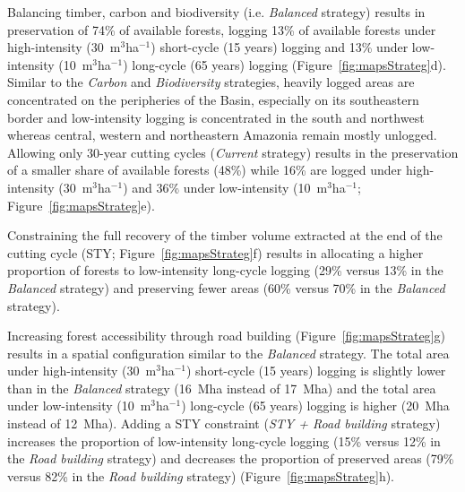 \documentclass{article}
\begin{document}
Balancing timber, carbon and biodiversity (i.e. \textit{Balanced} strategy) results in preservation of 74\% of available forests, logging 13\% of available forests under high-intensity (30~m$^3$ha$^{-1}$) short-cycle (15 years) logging and 13\% under low-intensity (10~m$^3$ha$^{-1}$) long-cycle (65 years) logging (Figure~\ref{fig:mapsStrateg}d). Similar to the \textit{Carbon} and \textit{Biodiversity} strategies, heavily logged areas are concentrated on the peripheries of the Basin, especially on its southeastern border and  low-intensity logging is concentrated in the south and northwest whereas central, western and northeastern Amazonia remain mostly unlogged. Allowing only 30-year cutting cycles (\textit{Current} strategy) results in the preservation of a smaller share of available forests (48\%) while 16\% are logged under high-intensity (30~m$^3$ha$^{-1}$) and 36\% under low-intensity (10~m$^3$ha$^{-1}$;  Figure~\ref{fig:mapsStrateg}e). 

Constraining the full recovery of the timber volume extracted at the end of the cutting cycle (STY; Figure~\ref{fig:mapsStrateg}f) results in allocating a higher proportion of forests to low-intensity long-cycle logging (29\% versus 13\% in the \textit{Balanced} strategy) and preserving fewer areas (60\% versus 70\% in the \textit{Balanced} strategy).

Increasing forest accessibility through road building (Figure~\ref{fig:mapsStrateg}g) results in a spatial configuration similar to the \textit{Balanced} strategy. The total area under high-intensity (30~m$^3$ha$^{-1}$) short-cycle (15 years) logging is slightly lower than in the \textit{Balanced} strategy (16~Mha instead of 17~Mha) and the total area under low-intensity (10~m$^3$ha$^{-1}$) long-cycle (65 years) logging is higher (20~Mha instead of 12~Mha). Adding a STY constraint (\textit{STY + Road building} strategy) increases the proportion of low-intensity long-cycle logging (15\% versus 12\% in the \textit{Road building} strategy) and decreases the proportion of preserved areas (79\% versus 82\% in the \textit{Road building} strategy)  (Figure~\ref{fig:mapsStrateg}h). 
\end{document}
